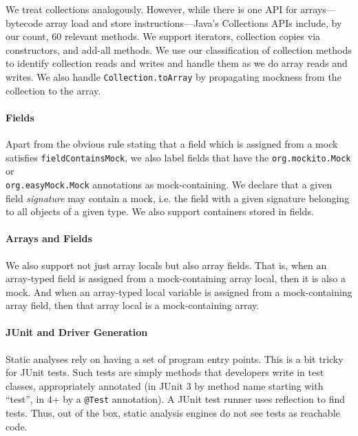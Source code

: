 We treat collections analogously. However, while there is one API for arrays---bytecode array load and store instructions---Java's Collections APIs include, by our count, 60 relevant methods. We support iterators, collection copies via constructors, and add-all methods. We use our classification of collection methods to identify collection reads and writes and handle them as we do array reads and writes. We also handle {\tt Collection.toArray} by propagating mockness from the collection to the array.%

\paragraph{Fields} Apart from the obvious rule stating that a field which is assigned from a mock satisfies {\tt fieldContainsMock}, we also label fields that have the {\tt org.mockito.Mock} or \\{\tt org.easyMock.Mock} annotations as mock-containing. We declare that a given field \emph{signature} may contain a mock, i.e. the field with a given signature belonging to all objects of a given type. We also support containers stored in fields.

\paragraph{Arrays and Fields} We also support not just array locals but also array fields. That is, when an array-typed field is assigned from a mock-containing array local, then it is also a mock. And when an array-typed local variable is assigned from a mock-containing array field, then that array local is a mock-containing array.




\paragraph{JUnit and Driver Generation}
Static analyses rely on having a set of program entry points. This is a bit tricky for JUnit tests.
Such tests are simply methods that developers write in test classes, appropriately annotated (in JUnit 3 by method name starting with ``test'', in 4+ by a \texttt{@Test} annotation). A JUnit test runner uses reflection to find tests. Thus, out of the box, static analysis engines do not see tests as reachable code.

